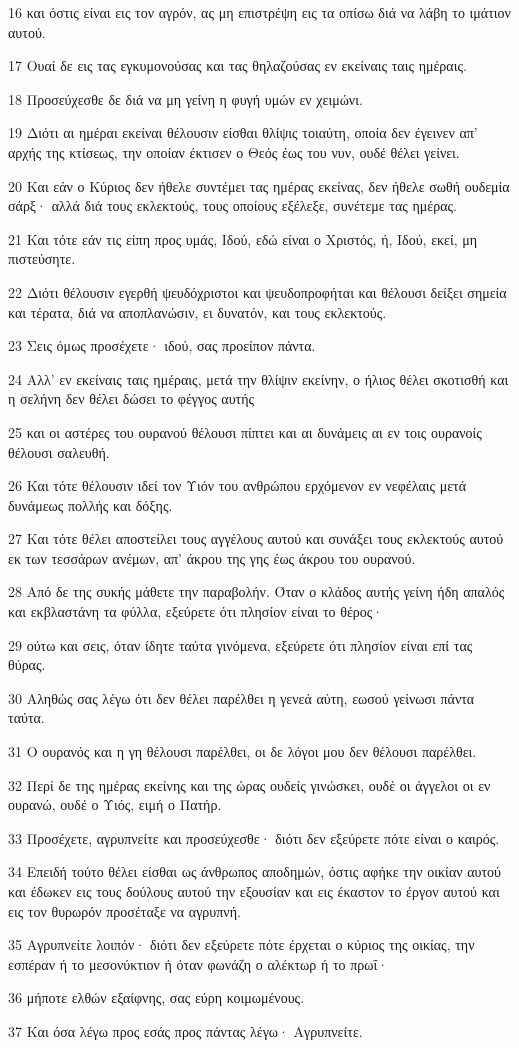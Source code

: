 \par 16 και όστις είναι εις τον αγρόν, ας μη επιστρέψη εις τα οπίσω διά να λάβη το ιμάτιον αυτού.
\par 17 Ουαί δε εις τας εγκυμονούσας και τας θηλαζούσας εν εκείναις ταις ημέραις.
\par 18 Προσεύχεσθε δε διά να μη γείνη η φυγή υμών εν χειμώνι.
\par 19 Διότι αι ημέραι εκείναι θέλουσιν είσθαι θλίψις τοιαύτη, οποία δεν έγεινεν απ' αρχής της κτίσεως, την οποίαν έκτισεν ο Θεός έως του νυν, ουδέ θέλει γείνει.
\par 20 Και εάν ο Κύριος δεν ήθελε συντέμει τας ημέρας εκείνας, δεν ήθελε σωθή ουδεμία σάρξ· αλλά διά τους εκλεκτούς, τους οποίους εξέλεξε, συνέτεμε τας ημέρας.
\par 21 Και τότε εάν τις είπη προς υμάς, Ιδού, εδώ είναι ο Χριστός, ή, Ιδού, εκεί, μη πιστεύσητε.
\par 22 Διότι θέλουσιν εγερθή ψευδόχριστοι και ψευδοπροφήται και θέλουσι δείξει σημεία και τέρατα, διά να αποπλανώσιν, ει δυνατόν, και τους εκλεκτούς.
\par 23 Σεις όμως προσέχετε· ιδού, σας προείπον πάντα.
\par 24 Αλλ' εν εκείναις ταις ημέραις, μετά την θλίψιν εκείνην, ο ήλιος θέλει σκοτισθή και η σελήνη δεν θέλει δώσει το φέγγος αυτής
\par 25 και οι αστέρες του ουρανού θέλουσι πίπτει και αι δυνάμεις αι εν τοις ουρανοίς θέλουσι σαλευθή.
\par 26 Και τότε θέλουσιν ιδεί τον Υιόν του ανθρώπου ερχόμενον εν νεφέλαις μετά δυνάμεως πολλής και δόξης.
\par 27 Και τότε θέλει αποστείλει τους αγγέλους αυτού και συνάξει τους εκλεκτούς αυτού εκ των τεσσάρων ανέμων, απ' άκρου της γης έως άκρου του ουρανού.
\par 28 Από δε της συκής μάθετε την παραβολήν. Όταν ο κλάδος αυτής γείνη ήδη απαλός και εκβλαστάνη τα φύλλα, εξεύρετε ότι πλησίον είναι το θέρος·
\par 29 ούτω και σεις, όταν ίδητε ταύτα γινόμενα, εξεύρετε ότι πλησίον είναι επί τας θύρας.
\par 30 Αληθώς σας λέγω ότι δεν θέλει παρέλθει η γενεά αύτη, εωσού γείνωσι πάντα ταύτα.
\par 31 Ο ουρανός και η γη θέλουσι παρέλθει, οι δε λόγοι μου δεν θέλουσι παρέλθει.
\par 32 Περί δε της ημέρας εκείνης και της ώρας ουδείς γινώσκει, ουδέ οι άγγελοι οι εν ουρανώ, ουδέ ο Υιός, ειμή ο Πατήρ.
\par 33 Προσέχετε, αγρυπνείτε και προσεύχεσθε· διότι δεν εξεύρετε πότε είναι ο καιρός.
\par 34 Επειδή τούτο θέλει είσθαι ως άνθρωπος αποδημών, όστις αφήκε την οικίαν αυτού και έδωκεν εις τους δούλους αυτού την εξουσίαν και εις έκαστον το έργον αυτού και εις τον θυρωρόν προσέταξε να αγρυπνή.
\par 35 Αγρυπνείτε λοιπόν· διότι δεν εξεύρετε πότε έρχεται ο κύριος της οικίας, την εσπέραν ή το μεσονύκτιον ή όταν φωνάζη ο αλέκτωρ ή το πρωΐ·
\par 36 μήποτε ελθών εξαίφνης, σας εύρη κοιμωμένους.
\par 37 Και όσα λέγω προς εσάς προς πάντας λέγω· Αγρυπνείτε.


